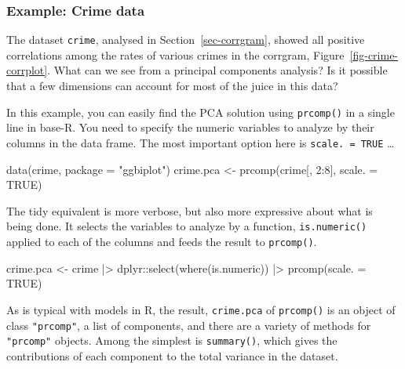 \documentclass[
  letterpaper,
  10pt,
  krantz2]{krantz}
\makeatletter
\newenvironment{Shaded}{\begin{snugshade}}{\end{snugshade}}
\newcommand{\AttributeTok}[1]{\textcolor[rgb]{0.40,0.45,0.13}{#1}}
\newcommand{\ConstantTok}[1]{\textcolor[rgb]{0.56,0.35,0.01}{#1}}
\newcommand{\DecValTok}[1]{\textcolor[rgb]{0.68,0.00,0.00}{#1}}
\newcommand{\FunctionTok}[1]{\textcolor[rgb]{0.28,0.35,0.67}{#1}}
\newcommand{\NormalTok}[1]{\textcolor[rgb]{0.00,0.23,0.31}{#1}}
\newcommand{\OtherTok}[1]{\textcolor[rgb]{0.00,0.23,0.31}{#1}}
\newcommand{\SpecialCharTok}[1]{\textcolor[rgb]{0.37,0.37,0.37}{#1}}
\newcommand{\StringTok}[1]{\textcolor[rgb]{0.13,0.47,0.30}{#1}}
\newenvironment{kframe}{%
  \medskip{}
  \setlength{\fboxsep}{.8em}
  \def\at@end@of@kframe{}%
  \ifinner\ifhmode%
  \def\at@end@of@kframe{\end{minipage}}%
  \begin{minipage}{\columnwidth}%
  \fi\fi%
  \def\FrameCommand##1{\hskip\@totalleftmargin \hskip-\fboxsep
  \colorbox{shadecolor}{##1}\hskip-\fboxsep
      \hskip-\linewidth \hskip-\@totalleftmargin \hskip\columnwidth}%
  \MakeFramed {\advance\hsize-\width
    \@totalleftmargin\z@ \linewidth\hsize
    \@setminipage}}%
{\par\unskip\endMakeFramed%
  \at@end@of@kframe}
\renewenvironment{Shaded}{\begin{kframe}}{\end{kframe}}
\makeatother
\begin{document}
\hypertarget{example-crime-data}{%
\subsubsection*{Example: Crime data}\label{example-crime-data}}

The dataset \texttt{crime}, analysed in Section~\ref{sec-corrgram},
showed all positive correlations among the rates of various crimes in
the corrgram, Figure~\ref{fig-crime-corrplot}. What can we see from a
principal components analysis? Is it possible that a few dimensions can
account for most of the juice in this data?

In this example, you can easily find the PCA solution using
\texttt{prcomp()} in a single line in base-R. You need to specify the
numeric variables to analyze by their columns in the data frame. The
most important option here is \texttt{scale.\ =\ TRUE} \ldots{}

\begin{Shaded}
\begin{Highlighting}[]
\FunctionTok{data}\NormalTok{(crime, }\AttributeTok{package =} \StringTok{"ggbiplot"}\NormalTok{)}
\NormalTok{crime.pca }\OtherTok{\textless{}{-}} \FunctionTok{prcomp}\NormalTok{(crime[, }\DecValTok{2}\SpecialCharTok{:}\DecValTok{8}\NormalTok{], }\AttributeTok{scale. =} \ConstantTok{TRUE}\NormalTok{)}
\end{Highlighting}
\end{Shaded}

The tidy equivalent is more verbose, but also more expressive about what
is being done. It selects the variables to analyze by a function,
\texttt{is.numeric()} applied to each of the columns and feeds the
result to \texttt{prcomp()}.

\begin{Shaded}
\begin{Highlighting}[]
\NormalTok{crime.pca }\OtherTok{\textless{}{-}} 
\NormalTok{  crime }\SpecialCharTok{|\textgreater{}} 
\NormalTok{  dplyr}\SpecialCharTok{::}\FunctionTok{select}\NormalTok{(}\FunctionTok{where}\NormalTok{(is.numeric)) }\SpecialCharTok{|\textgreater{}}
  \FunctionTok{prcomp}\NormalTok{(}\AttributeTok{scale. =} \ConstantTok{TRUE}\NormalTok{)}
\end{Highlighting}
\end{Shaded}

As is typical with models in R, the result, \texttt{crime.pca} of
\texttt{prcomp()} is an object of class \texttt{"prcomp"}, a list of
components, and there are a variety of methods for \texttt{"prcomp"}
objects. Among the simplest is \texttt{summary()}, which gives the
contributions of each component to the total variance in the dataset.
\end{document}
